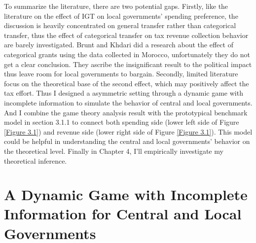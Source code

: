 To summarize the literature, there are two potential gaps. Firstly, like the literature on the effect of IGT on local governments' spending preference, the discussion is heavily concentrated on general transfer rather than categorical transfer, thus the effect of categorical transfer on tax revenue collection behavior are barely investigated. Brunt and Khdari \cite{2016The} did a research about the effect of categorical grants using the data collected in Morocco, unfortunately they do not get a clear conclusion. They ascribe the insignificant result to the political impact thus leave room for local governments to bargain. Secondly, limited literature focus on the theoretical base of the second effect, which may positively affect the tax effort. Thus I designed a asymmetric setting through a dynamic game with incomplete information to simulate the  behavior of central and local governments. And I combine the game theory analysis result with the prototypical benchmark model in section 3.1.1 to connect both spending side (lower left side of Figure \ref{Figure 3.1}) and revenue side (lower right side of Figure \ref{Figure 3.1}). This model could be helpful in understanding the central and local governments' behavior on the theoretical level. Finally in Chapter 4, I'll empirically investigate my theoretical inference.

\section{A Dynamic Game with Incomplete Information for Central and Local Governments}



